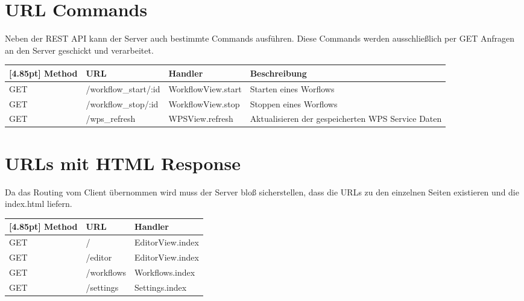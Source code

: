 \newpage

	\section{URL Commands}
	Neben der REST API kann der Server auch bestimmte Commands ausführen. Diese Commands werden ausschließlich per GET Anfragen an
	den Server geschickt und verarbeitet.
	
	\begin{center}
	    \setlength\tabcolsep{5pt}
    	\renewcommand{\arraystretch}{1.5}
        	\begin{tabularx}{\textwidth}{|l|l|l|X|}
        	\hline
        	\rowcolor[gray]{0.75}[4.85pt]
    		Method & URL & Handler & Beschreibung \\ \hline 
            GET & /workflow_start/:id & WorkflowView.start & Starten eines Worflows \\ \hline
            GET & /workflow_stop/:id & WorkflowView.stop & Stoppen eines Worflows \\ \hline
            GET & /wps_refresh & WPSView.refresh & Aktualisieren der gespeicherten WPS Service Daten \\ \hline
        	\end{tabularx}
	\end{center}
	
	\section{URLs mit HTML Response}
	Da das Routing vom Client übernommen wird muss der Server bloß sicherstellen, dass die URLs zu den einzelnen Seiten existieren
	und die index.html liefern.
	
	\begin{center}
	    \setlength\tabcolsep{5pt}
    	\renewcommand{\arraystretch}{1.5}
        	\begin{tabularx}{\textwidth}{|l|l|X|}
        	\hline
        	\rowcolor[gray]{0.75}[4.85pt]
    		Method & URL & Handler \\ \hline 
            GET & / & EditorView.index \\ \hline
            GET & /editor & EditorView.index \\ \hline
            GET & /workflows & Workflows.index \\ \hline
            GET & /settings & Settings.index \\ \hline
        	\end{tabularx}
	\end{center}